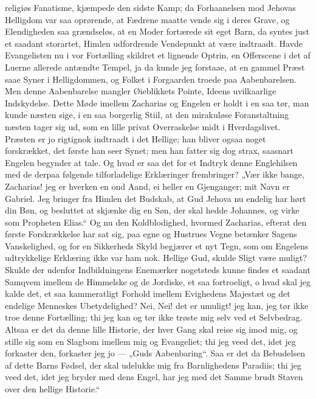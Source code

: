 \documentclass[12pt,a4paper]{book}
\begin{document}
religiøs Fanatisme, kjæmpede den sidste Kamp; da Forhaanelsen mod
Jehovas Helligdom var saa oprørende, at Fædrene maatte vende sig i
deres Grave, og Elendigheden saa grændseløs, at en Moder fortærede
sit eget Barn, da syntes just et saadant storartet, Himlen
udfordrende Vendepunkt at være indtraadt. Havde Evangelisten nu i
vor Fortælling skildret et lignende Optrin, en Offerscene i det af
Luerne allerede antændte Tempel, ja da kunde jeg forstaae, at en
gammel Præst saae Syner i Helligdommen, og Folket i Forgaarden
troede paa Aabenbarelsen. Men denne Aabenbarelse mangler
Øieblikkets Pointe, Ideens uvilkaarlige Indskydelse. Dette Møde
imellem Zacharias og Engelen er holdt i en saa tør, man kunde
næsten sige, i en saa borgerlig Stiil, at den mirakuløse
Foranstaltning næsten tager sig ud, som en lille privat
Overraskelse midt i Hverdagslivet. Præsten er jo rigtignok
indtraadt i det Hellige; han bliver ogsaa noget forskrækket, det
første han seer Synet; men han fatter sig dog strax, saasnart
Engelen begynder at tale. Og hvad er saa det for et Indtryk denne
Englehilsen med de derpaa følgende tilforladelige Erklæringer
frembringer? „Vær ikke bange, Zacharias! jeg er hverken en ond
Aand, ei heller en Gjenganger; mit Navn er Gabriel. Jeg bringer
fra Himlen det Budskab, at Gud Jehova nu endelig har hørt din Bøn,
og besluttet at skjænke dig en Søn, der skal hedde Johannes, og
virke som Propheten Elias.“ Og nu den Koldblodighed, hvormed
Zacharias,
efterat den første Forskrækkelse har sat sig, paa egne og Hustrues
Vegne betænker Sagens Vanskelighed, og for en Sikkerheds Skyld
begjærer et nyt Tegn, som om Engelens udtrykkelige Erklæring ikke
var ham nok. Hellige Gud, skulde Sligt være muligt? Skulde der
udenfor Indbildningens Enemærker nogetsteds kunne findes et
saadant Samqvem imellem de Himmelske og de Jordiske, et saa
fortroeligt, o hvad skal jeg kalde det, et saa kammeratligt
Forhold imellem Evighedens Majestæt og det endelige Menneskes
Ubetydelighed? Nei, Nei! det er umuligt! jeg kan, jeg tør ikke
troe denne Fortælling; thi jeg kan og tør ikke trøste mig selv ved
et Selvbedrag. Altsaa er det da denne lille Historie, der hver
Gang skal reise sig imod mig, og stille sig som en Slagbom imellem
mig og Evangeliet; thi jeg veed det, idet jeg forkaster den,
forkaster jeg jo --- „Guds Aabenbaring“. Saa er det da
Bebudelsen af dette Barns Fødsel, der skal udelukke mig fra
Barnlighedens Paradiis; thi jeg veed det, idet jeg bryder med dens
Engel, har jeg med det Samme brudt Staven over den hellige
Historie.“
\end{document}
